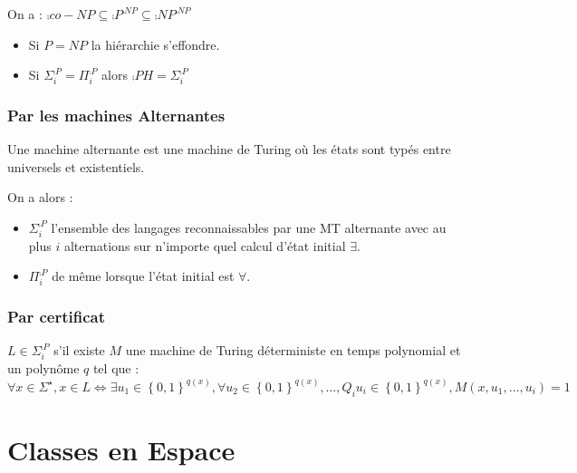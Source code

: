 \documentclass{cours}
\begin{document}
\begin{proposition}
    On a : $\comp{co-NP} \subseteq \comp{P}^{\comp{NP}} \subseteq \comp{NP}^{\comp{NP}}$
    \begin{itemize}
        \item Si $P = NP$ la hiérarchie s'effondre.
        \item Si $\Sigma_{i}^{\comp{P}} = \Pi_{i}^{\comp{P}}$ alors $\comp{PH} = \Sigma_{i}^{\comp{P}}$
    \end{itemize}
\end{proposition}

\subsubsection{Par les machines Alternantes}
\begin{definition}
    Une machine alternante est une machine de Turing où les états sont typés entre universels et existentiels.
\end{definition}

\begin{proposition}
    On a alors : 
    \begin{itemize}
        \item $\Sigma_{i}^{\comp{P}}$ l'ensemble des langages reconnaissables par une MT alternante avec au plus $i$ alternations sur n'importe quel calcul d'état initial $\exists$.
        \item $\Pi_{i}^{\comp{P}}$ de même lorsque l'état initial est $\forall$.
    \end{itemize}
\end{proposition}

\subsubsection{Par certificat}
\begin{proposition}
    $L \in \Sigma_{i}^{\comp{P}}$ s'il existe $M$ une machine de Turing déterministe en temps polynomial et un polynôme $q$ tel que : 
    \[
        \forall x \in \Sigma^{\star}, x \in L \Leftrightarrow \exists u_{1} \in \left\{0, 1\right\}^{q(x)}, \forall u_{2} \in \left\{0, 1\right\}^{q(x)}, \ldots, Q_{i}u_{i} \in \left\{0, 1\right\}^{q(x)}, M(x, u_{1}, \ldots, u_{i}) = 1
    \]
\end{proposition}

\section{Classes en Espace}
\end{document}
